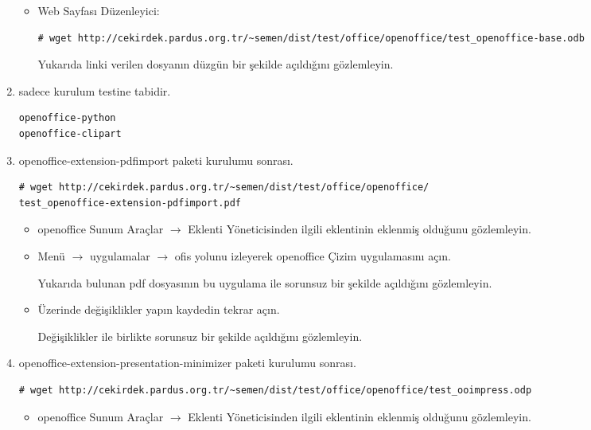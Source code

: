 \documentclass[a4paper,10pt]{article}
\begin{document}
\begin{enumerate}
\begin{itemize}
\item Web Sayfası Düzenleyici:
\begin{verbatim}
# wget http://cekirdek.pardus.org.tr/~semen/dist/test/office/openoffice/test_openoffice-base.odb
\end{verbatim}

Yukarıda linki verilen dosyanın düzgün bir şekilde açıldığını gözlemleyin.

\end{itemize}

 \item sadece kurulum testine tabidir.
\begin{verbatim}
openoffice-python
openoffice-clipart
\end{verbatim}

 \item openoffice-extension-pdfimport paketi kurulumu sonrası.
\begin{verbatim}
# wget http://cekirdek.pardus.org.tr/~semen/dist/test/office/openoffice/
test_openoffice-extension-pdfimport.pdf
\end{verbatim}

\begin{itemize}
\item openoffice Sunum Araçlar $\rightarrow$ Eklenti Yöneticisinden ilgili eklentinin eklenmiş olduğunu gözlemleyin.

\item Menü $\rightarrow$ uygulamalar $\rightarrow$ ofis yolunu izleyerek openoffice Çizim uygulamasını açın.

Yukarıda bulunan pdf dosyasının bu uygulama ile sorunsuz bir şekilde açıldığını gözlemleyin.
\item Üzerinde değişiklikler yapın kaydedin tekrar açın.

Değişiklikler ile birlikte sorunsuz bir şekilde açıldığını gözlemleyin.

\end{itemize}
 
\item openoffice-extension-presentation-minimizer paketi kurulumu sonrası.
\begin{verbatim}
# wget http://cekirdek.pardus.org.tr/~semen/dist/test/office/openoffice/test_ooimpress.odp
\end{verbatim}

\begin{itemize}
\item openoffice Sunum Araçlar $\rightarrow$ Eklenti Yöneticisinden ilgili eklentinin eklenmiş olduğunu gözlemleyin.


\end{itemize}
\end{enumerate}
\end{document}
